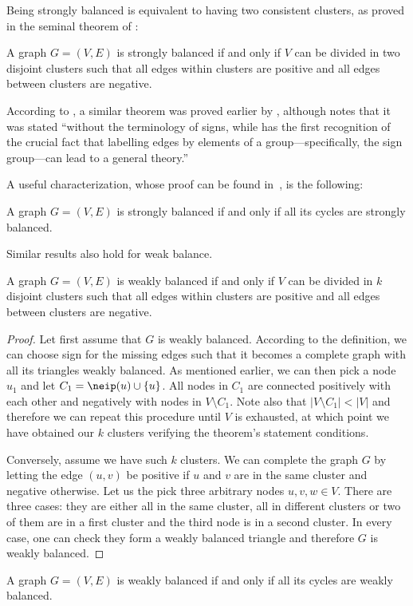 Being strongly balanced is equivalent to having two consistent clusters, as proved in the seminal
theorem of \textcite[Theorem 3]{harary1953}:
\begin{theorem}
  A graph $G=(V,E)$ is strongly balanced if and only if $V$ can be divided in two disjoint clusters
  such that all edges within clusters are positive and all edges between clusters are negative.
\end{theorem}

According to \textcite{Huffner2010}, a similar theorem was proved earlier by \textcite[Theorem
X.11]{Konig36}, although \textcite{Zaslavsky2012} notes that it was stated \enquote{without the
terminology of signs, while \autocite{harary1953} has the first recognition of the crucial fact that
labelling edges by elements of a group---specifically, the sign group---can lead to a general
theory.}

A useful characterization, whose proof can be found in~\autocite[page 122]{BookKleinberg2010}, is the
following:
\begin{theorem}
  A graph $G=(V,E)$ is strongly balanced if and only if all its cycles are strongly balanced.
\end{theorem}

Similar results also hold for weak balance.
\begin{theorem}
  A graph $G=(V,E)$ is weakly balanced if and only if $V$ can be divided in $k$ disjoint clusters
  such that all edges within clusters are positive and all edges between clusters are negative.
\end{theorem}
\begin{proof}
  Let first assume that $G$ is weakly balanced. According to the definition, we can choose sign for
  the missing edges such that it becomes a complete graph with all its triangles weakly balanced. As
  mentioned earlier, we can then pick a node $u_1$ and let $C_1 = \neip(u) \cup \{u\}$. All
  nodes in $C_1$ are connected positively with each other and negatively with nodes in $V\setminus
  C_1$. Note also that $|V\setminus C_1| < |V|$ and therefore we can repeat this
  procedure until $V$ is exhausted, at which point we have obtained our $k$ clusters verifying the
  theorem's statement conditions.

  Conversely, assume we have such $k$ clusters. We can complete the graph $G$ by letting the edge
  $(u,v)$ be positive if $u$ and $v$ are in the same cluster and negative otherwise. Let us the pick
  three arbitrary nodes $u,v,w\in V$. There are three cases: they are either all in the same
  cluster, all in different clusters or two of them are in a first cluster and the third node is in
  a second cluster. In every case, one can check they form a weakly balanced triangle and therefore
  $G$ is weakly balanced.
\end{proof}
\begin{theorem}
  A graph $G=(V,E)$ is weakly balanced if and only if all its cycles are weakly balanced.
\end{theorem}

